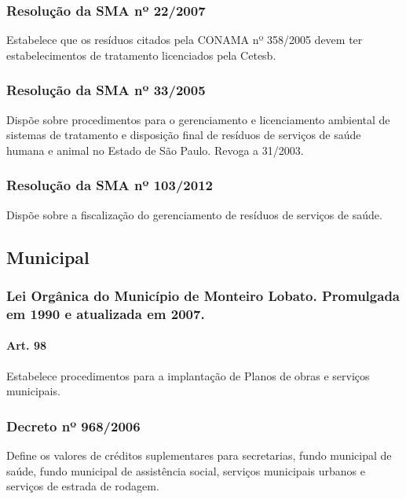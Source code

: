 \begin{subapend}
\begin{subsubapend}
		\subsubsection{Resolução da SMA nº 22/2007}
		Estabelece que os resíduos citados pela CONAMA nº 358/2005 devem ter estabelecimentos de tratamento licenciados pela Cetesb.
		\subsubsection{Resolução da SMA nº 33/2005}
		Dispõe sobre procedimentos para o gerenciamento e licenciamento ambiental de sistemas de tratamento e disposição final de resíduos de serviços de saúde humana e animal no Estado de São Paulo. Revoga a 31/2003.
		\subsubsection{Resolução da SMA nº 103/2012}
		Dispõe sobre a fiscalização do gerenciamento de resíduos de serviços de saúde.
	\end{subsubapend}
\end{subapend}


\begin{subapend}
	\subsection{Municipal}
	\begin{subsubapend}
		\item \subsubsection{Lei Orgânica do Município de Monteiro Lobato. Promulgada em 1990 e atualizada em 2007.}
		\paragraph{Art. 98} Estabelece procedimentos para a implantação de Planos de obras e serviços municipais.
		\subsubsection{Decreto nº 968/2006}
		Define os valores de créditos suplementares para secretarias, fundo municipal de saúde, fundo municipal de assistência social, serviços municipais urbanos e serviços de estrada de rodagem.
	\end{subsubapend}
\end{subapend}


